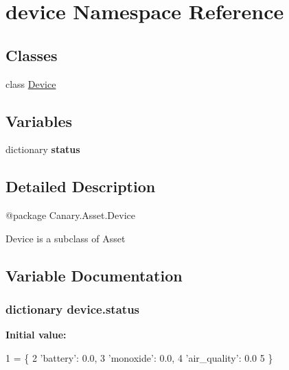 \hypertarget{namespacedevice}{\section{device Namespace Reference}
\label{namespacedevice}
}
\subsection*{Classes}
\begin{DoxyCompactItemize}
\item 
class \hyperlink{classdevice_1_1_device}{Device}
\end{DoxyCompactItemize}
\subsection*{Variables}
\begin{DoxyCompactItemize}
\item 
dictionary {\bfseries status}
\end{DoxyCompactItemize}


\subsection{Detailed Description}
\begin{DoxyVerb}@package Canary.Asset.Device

Device is a subclass of Asset
\end{DoxyVerb}
 

\subsection{Variable Documentation}
\hypertarget{namespacedevice_a9d055d66be48177d3fa562943d9ffc9e}{
\subsubsection[{status}]{\setlength{\rightskip}{0pt plus 5cm}dictionary device.\-status}}\label{namespacedevice_a9d055d66be48177d3fa562943d9ffc9e}
{\bfseries Initial value\-:}
\begin{DoxyCode}
1 = \{
2     \textcolor{stringliteral}{'battery'}: 0.0,
3     \textcolor{stringliteral}{'monoxide'}: 0.0,
4     \textcolor{stringliteral}{'air\_quality'}: 0.0  
5 \}
\end{DoxyCode}
